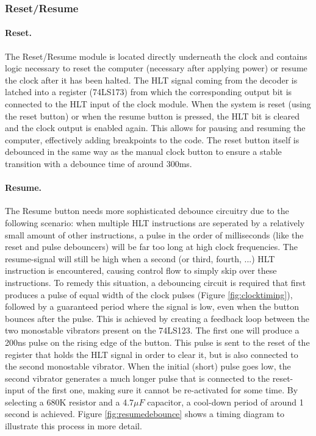\subsubsection{Reset/Resume} \label{sec:resetresume}
\paragraph{Reset.} The Reset/Resume module is located directly underneath the clock and contains logic necessary to reset the computer (necessary after applying power) or resume the clock after it has been halted. The HLT signal coming from the decoder is latched into a register (74LS173) from which the corresponding output bit is connected to the HLT input of the clock module. When the system is reset (using the reset button) or when the resume button is pressed, the HLT bit is cleared and the clock output is enabled again. This allows for pausing and resuming the computer, effectively adding breakpoints to the code. The reset button itself is debounced in the same way as the manual clock button to ensure a stable transition with a debounce time of around 300ms.

\paragraph{Resume.} The Resume button needs more sophisticated debounce circuitry due to the following scenario: when multiple HLT instructions are seperated by a relatively small amount of other instructions, a pulse in the order of milliseconds (like the reset and pulse debouncers) will be far too long at high clock frequencies. The resume-signal will still be high when a second (or third, fourth, ...) HLT instruction is encountered, causing control flow to simply skip over these instructions. To remedy this situation, a debouncing circuit is required that first produces a pulse of equal width of the clock pulses (Figure \ref{fig:clocktiming}), followed by a guaranteed period where the signal is low, even when the button bounces after the pulse. This is achieved by creating a feedback loop between the two monostable vibrators present on the 74LS123. The first one will produce a 200ns pulse on the rising edge of the button. This pulse is sent to the reset of the register that holds the HLT signal in order to clear it, but is also connected to the second monostable vibrator. When the initial (short) pulse goes low, the second vibrator generates a much longer pulse that is connected to the reset-input of the first one, making sure it cannot be re-activated for some time. By selecting a 680K resistor and a 4.7$\mu F$ capacitor, a cool-down period of around 1 second is achieved. Figure \ref{fig:resumedebounce} shows a timing diagram to illustrate this process in more detail. 

